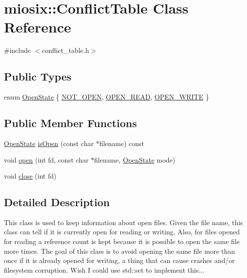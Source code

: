 \hypertarget{classmiosix_1_1_conflict_table}{\section{miosix\-:\-:Conflict\-Table Class Reference}
\label{classmiosix_1_1_conflict_table}
}


{\ttfamily \#include $<$conflict\-\_\-table.\-h$>$}

\subsection*{Public Types}
\begin{DoxyCompactItemize}
\item 
enum \hyperlink{classmiosix_1_1_conflict_table_a46499bf8153680f103a474c9bd2fb5e1}{Open\-State} \{ \hyperlink{classmiosix_1_1_conflict_table_a46499bf8153680f103a474c9bd2fb5e1a8f37c33dd680b9b8f8d3ddf9b1eb8746}{N\-O\-T\-\_\-\-O\-P\-E\-N}, 
\hyperlink{classmiosix_1_1_conflict_table_a46499bf8153680f103a474c9bd2fb5e1aea1a6958403f9949700b56d66f1080bc}{O\-P\-E\-N\-\_\-\-R\-E\-A\-D}, 
\hyperlink{classmiosix_1_1_conflict_table_a46499bf8153680f103a474c9bd2fb5e1ac6aaa08527137fda829d6f2e5a2301d6}{O\-P\-E\-N\-\_\-\-W\-R\-I\-T\-E}
 \}
\end{DoxyCompactItemize}
\subsection*{Public Member Functions}
\begin{DoxyCompactItemize}
\item 
\hyperlink{classmiosix_1_1_conflict_table_a46499bf8153680f103a474c9bd2fb5e1}{Open\-State} \hyperlink{classmiosix_1_1_conflict_table_aa8f6c7d1fb129de0602e1319c6054023}{is\-Open} (const char $\ast$filename) const 
\item 
void \hyperlink{classmiosix_1_1_conflict_table_a11b1815d854928bd578b29da666d801f}{open} (int fd, const char $\ast$filename, \hyperlink{classmiosix_1_1_conflict_table_a46499bf8153680f103a474c9bd2fb5e1}{Open\-State} mode)
\item 
void \hyperlink{classmiosix_1_1_conflict_table_a24a9284e4564f4ad87483a3edbd70adb}{close} (int fd)
\end{DoxyCompactItemize}


\subsection{Detailed Description}
This class is used to keep information about open files. Given the file name, this class can tell if it is currently open for reading or writing. Also, for files opened for reading a reference count is kept because it is possible to open the same file more times. The goal of this class is to avoid opening the same file more than once if it is already opened for writing, a thing that can cause crashes and/or filesystem corruption. Wish I could use std\-::set to implement this... 

